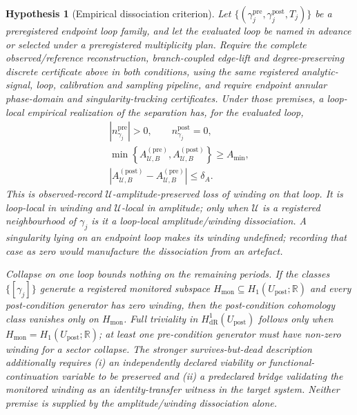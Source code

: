 \documentclass[11pt]{article}
\newtheorem{hypothesis}[theorem]{Hypothesis}
\theoremstyle{definition}
\newcommand{\dR}{\mathrm{dR}}
\begin{document}
\begin{hypothesis}[Empirical dissociation criterion]\label{hyp:empirical}
Let \(\{(\gamma_j^{\mathrm{pre}},\gamma_j^{\mathrm{post}},T_j)\}\) be a
preregistered endpoint loop family, and let the evaluated loop be named in
advance or selected under a preregistered multiplicity plan.  Require the complete observed/reference reconstruction, branch-coupled
edge-lift and degree-preserving discrete certificate above in both
conditions, using the same registered analytic-signal, loop, calibration
and sampling pipeline, and
require endpoint annular phase-domain and singularity-tracking certificates.
Under those premises, a loop-local empirical realization of the separation
has, for the evaluated loop,
\[
\begin{gathered}
|n_{\gamma_j}^{\mathrm{pre}}|>0,\qquad
n_{\gamma_j}^{\mathrm{post}}=0,\\
\min\!\left\{A_{\mathcal U,B}^{(\mathrm{pre})},
             A_{\mathcal U,B}^{(\mathrm{post})}\right\}\ge A_{\min},\\
\left|A_{\mathcal U,B}^{(\mathrm{post})}
      -A_{\mathcal U,B}^{(\mathrm{pre})}\right|
   \le\delta_A.
\end{gathered}
\]
This is observed-record \(\mathcal U\)-amplitude-preserved loss of winding
on that loop.  It is loop-local in winding and \(\mathcal U\)-local in
amplitude; only when \(\mathcal U\) is a registered neighbourhood of
\(\gamma_j\) is it a loop-local amplitude/winding dissociation.  A
singularity lying on an endpoint loop makes its winding undefined; recording
that case as zero would manufacture the dissociation from an artefact.

Collapse on one loop bounds nothing on the remaining periods.  If the
classes \(\{[\gamma_j]\}\) generate a registered monitored subspace
\(H_{\mathrm{mon}}\subseteq H_1(U_{\mathrm{post}};\mathbb R)\) and every
post-condition generator has zero winding, then the post-condition
cohomology class vanishes only on \(H_{\mathrm{mon}}\).  Full triviality in
\(H^1_{\dR}(U_{\mathrm{post}})\) follows only when
\(H_{\mathrm{mon}}=H_1(U_{\mathrm{post}};\mathbb R)\); at least one
pre-condition generator must have non-zero winding for a sector collapse.
The stronger \emph{survives-but-dead} description additionally requires
(i) an independently declared viability or functional-continuation
variable to be preserved and (ii) a predeclared bridge validating the
monitored winding as an identity-transfer witness in the target system.
Neither premise is supplied by the amplitude/winding dissociation alone.
\end{hypothesis}
\end{document}

